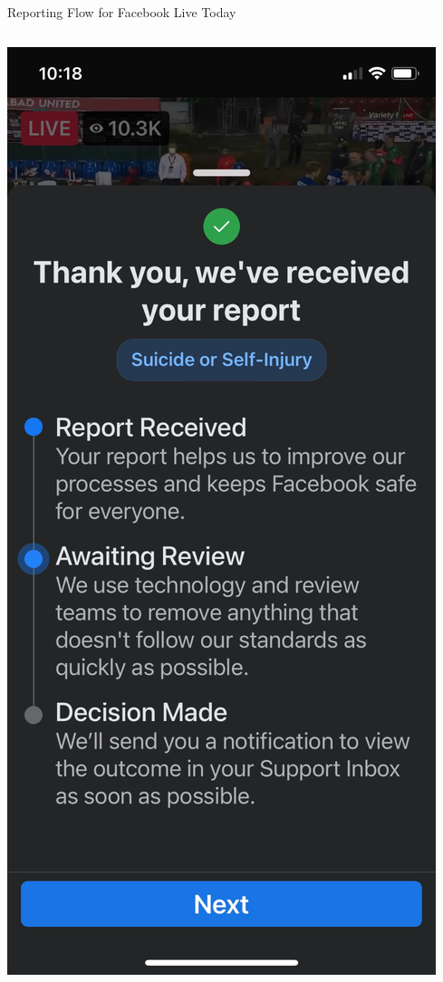 \documentclass[nobackground,dvipsnames,table,aspectratio=169]{beamer}
\begin{document}
\begin{frame}{Reporting Flow for Facebook Live Today}
\begin{columns}
            \includegraphics[width=\textwidth]{facebook-live-current-reporting-flow-2}

\end{columns}
\end{frame}
\end{document}
